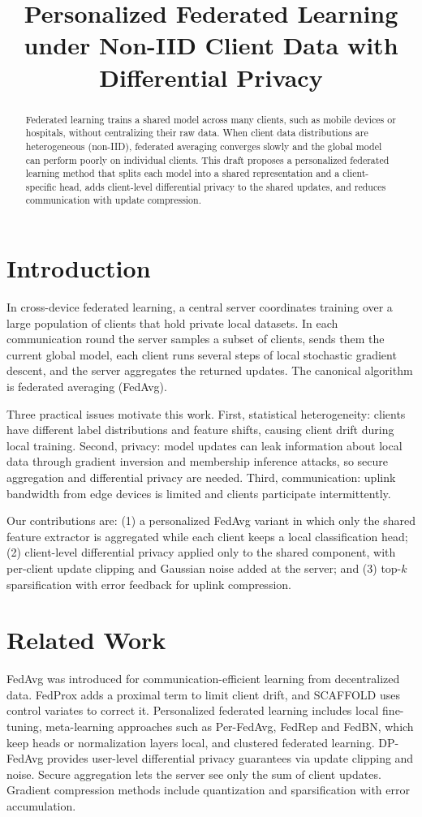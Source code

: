 \documentclass{article}
\title{Personalized Federated Learning under Non-IID Client Data with Differential Privacy}
\begin{document}
\maketitle

\begin{abstract}
Federated learning trains a shared model across many clients, such as mobile
devices or hospitals, without centralizing their raw data. When client data
distributions are heterogeneous (non-IID), federated averaging converges slowly
and the global model can perform poorly on individual clients. This draft
proposes a personalized federated learning method that splits each model into
a shared representation and a client-specific head, adds client-level
differential privacy to the shared updates, and reduces communication with
update compression.
\end{abstract}

\section{Introduction}
In cross-device federated learning, a central server coordinates training over
a large population of clients that hold private local datasets. In each
communication round the server samples a subset of clients, sends them the
current global model, each client runs several steps of local stochastic
gradient descent, and the server aggregates the returned updates. The
canonical algorithm is federated averaging (FedAvg).

Three practical issues motivate this work. First, statistical heterogeneity:
clients have different label distributions and feature shifts, causing client
drift during local training. Second, privacy: model updates can leak
information about local data through gradient inversion and membership
inference attacks, so secure aggregation and differential privacy are needed.
Third, communication: uplink bandwidth from edge devices is limited and
clients participate intermittently.

Our contributions are: (1) a personalized FedAvg variant in which only the
shared feature extractor is aggregated while each client keeps a local
classification head; (2) client-level differential privacy applied only to the
shared component, with per-client update clipping and Gaussian noise added at
the server; and (3) top-$k$ sparsification with error feedback for uplink
compression.

\section{Related Work}
FedAvg was introduced for communication-efficient learning from decentralized
data. FedProx adds a proximal term to limit client drift, and SCAFFOLD uses
control variates to correct it. Personalized federated learning includes local
fine-tuning, meta-learning approaches such as Per-FedAvg, FedRep and FedBN,
which keep heads or normalization layers local, and clustered federated
learning. DP-FedAvg provides user-level differential privacy guarantees via
update clipping and noise. Secure aggregation lets the server see only the sum
of client updates. Gradient compression methods include quantization and
sparsification with error accumulation.
\end{document}
